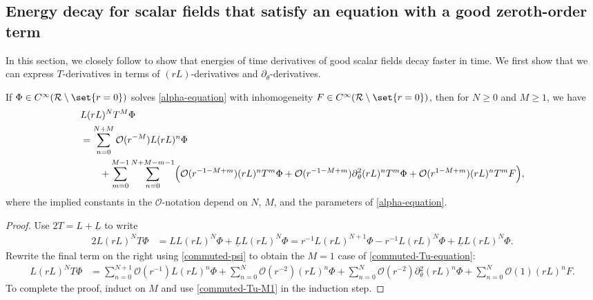 \documentclass[10pt, reqno]{amsart}
\begin{document}
\subsection{Energy decay for scalar fields that satisfy an equation with a good zeroth-order term}
\label{sec:energy-decay-good} In this section, we closely follow
\cite[Sec.~8]{GAJIC2023110058} to show that energies of time derivatives of good
scalar fields decay faster in time. We first show that we can express
\(T\)-derivatives in terms of \((rL)\)-derivatives and \(\partial_\theta{}\)-derivatives.
\begin{lemma}
If \(\Phi{}\in C^\infty(\mathcal{R}\setminus \set{r=0})\) solves \cref{alpha-equation} with
inhomogeneity \(F\in C^\infty(\mathcal{R}\setminus \set{r=0})\), then for \(N\ge 0\) and \(M\ge 1\), we have
\begin{equation}\label{commuted-Tu-equation}
\begin{split}
&L(rL)^NT^M\Phi{} \\
&= \sum_{n=0}^{N+M}\mathcal{O}(r^{-M})L(rL)^n\Phi{} \\
&\qquad + \sum_{m=0}^{M-1}\sum_{n=0}^{N+M-m-1}\Bigl(\mathcal{O}(r^{-1-M+m})(rL)^nT^m\Phi{} + \mathcal{O}(r^{-1-M+m})\partial{}_\theta^2(rL)^nT^m\Phi{} + \mathcal{O}(r^{1-M+m})(rL)^nT^mF\Bigr),
\end{split}
\end{equation}
where the implied constants in the \(\mathcal{O}\)-notation depend on \(N\),
\(M\), and the parameters of \cref{alpha-equation}.
\label{commuted-Tu}
\end{lemma}
\begin{proof}
Use \(2T = L + \underline{L}\) to write
\begin{equation}
\begin{split}
2L(rL)^NT\Phi{} &= LL(rL)^N\Phi{} + \underline{L}L(rL)^N\Phi{} = r^{-1}L(rL)^{N+1}\Phi{} - r^{-1}L(rL)^N\Phi{} + \underline{L}L(rL)^N\Phi{}.
\end{split}
\end{equation}
Rewrite the final term on the right using \cref{commuted-psi} to obtain
the \(M = 1\) case of \cref{commuted-Tu-equation}:
\begin{equation}\label{commuted-Tu-M1}
\begin{split}
L(rL)^NT\Phi{} &= \sum_{n=0}^{N+1}\mathcal{O}(r^{-1})L(rL)^n\Phi{} + \sum_{n=0}^{N}\mathcal{O}(r^{-2})(rL)^n\Phi{} + \sum_{n=0}^{N} \mathcal{O}(r^{-2})\partial{}_\theta^2(rL)^n\Phi{} + \sum_{n=0}^N\mathcal{O}(1)(rL)^nF.
\end{split}
\end{equation}
To complete the proof, induct on \(M\) and use \cref{commuted-Tu-M1} in the
induction step.
\end{proof}
\end{document}
